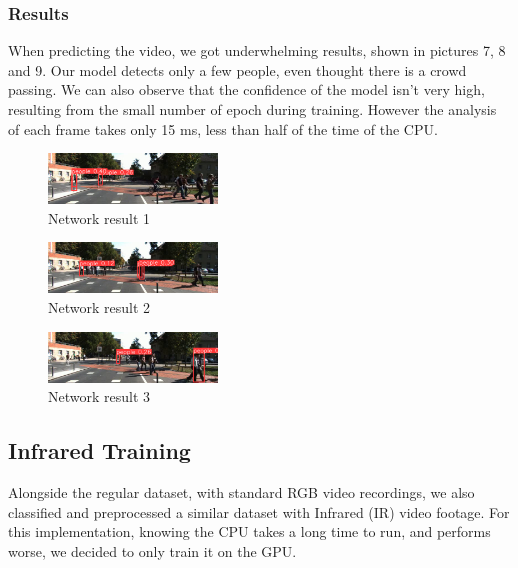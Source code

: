 \documentclass[conference]{IEEEtran}
\begin{document}
\subsubsection{Results}
When predicting the video, we got underwhelming results, shown in pictures 7, 8 and 9. Our model detects only a few people, even thought there is a crowd passing. We can also observe that the confidence of the model isn't very high, resulting from the small number of epoch during training. However the analysis of each frame takes only 15 ms, less than half of the time of the CPU.

\begin{figure}[ht!]
    \centering
    \includegraphics[width=0.4\textwidth]{Images/GPU/download (2).png}
    \caption{Network result 1}\label{NetRes1}
\end{figure}

\begin{figure}[ht!]
    \centering
    \includegraphics[width=0.4\textwidth]{Images/GPU/download (4).png}
    \caption{Network result 2}\label{fig:NetRes2}
\end{figure}

\begin{figure}[ht!]
    \centering
    \includegraphics[width=0.4\textwidth]{Images/GPU/download (3).png}
    \caption{Network result 3}\label{fig:NetRes3}
\end{figure}

\subsection{Infrared Training}
Alongside the regular dataset, with standard RGB video recordings, we also classified and preprocessed a similar dataset with Infrared (IR) video footage. For this implementation, knowing the CPU takes a long time to run, and performs worse, we decided to only train it on the GPU.
\end{document}

